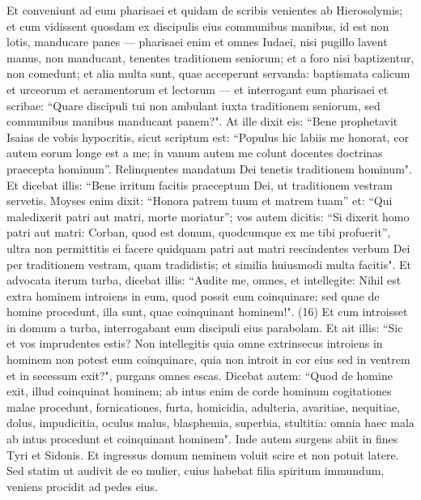 \begin{biblechapter}  
\verse Et conveniunt ad eum pharisaei et quidam de scribis venientes ab Hierosolymis; 
\verse et cum vidissent quosdam ex discipulis eius communibus manibus, id est non lotis, manducare panes 
\verse — pharisaei enim et omnes Iudaei, nisi pugillo lavent manus, non manducant, tenentes traditionem seniorum;  
\verse et a foro nisi baptizentur, non comedunt; et alia multa sunt, quae acceperunt servanda: baptismata calicum et urceorum et aeramentorum et lectorum — 
\verse et interrogant eum pharisaei et scribae: “Quare discipuli tui non ambulant iuxta traditionem seniorum, sed communibus manibus manducant panem?". 
\verse At ille dixit eis: “Bene prophetavit Isaias de vobis hypocritis, sicut scriptum est: “Populus hic labiis me honorat, cor autem eorum longe est a me; 
\verse in vanum autem me colunt docentes doctrinas praecepta hominum”. 
\verse Relinquentes mandatum Dei tenetis traditionem hominum". 
\verse Et dicebat illis: “Bene irritum facitis praeceptum Dei, ut traditionem vestram servetis.  
\verse Moyses enim dixit: “Honora patrem tuum et matrem tuam” et: “Qui maledixerit patri aut matri, morte moriatur”; 
\verse vos autem dicitis: “Si dixerit homo patri aut matri: Corban, quod est donum, quodcumque ex me tibi profuerit”,  
\verse ultra non permittitis ei facere quidquam patri aut matri 
\verse rescindentes verbum Dei per traditionem vestram, quam tradidistis; et similia huiusmodi multa facitis". 
\verse Et advocata iterum turba, dicebat illis: “Audite me, omnes, et intellegite:  
\verse Nihil est extra hominem introiens in eum, quod possit eum coinquinare; sed quae de homine procedunt, illa sunt, quae coinquinant hominem!". (16) 
\verse Et cum introisset in domum a turba, interrogabant eum discipuli eius parabolam. 
\verse Et ait illis: “Sic et vos imprudentes estis? Non intellegitis quia omne extrinsecus introiens in hominem non potest eum coinquinare, 
\verse quia non introit in cor eius sed in ventrem et in secessum exit?", purgans omnes escas. 
\verse Dicebat autem: “Quod de homine exit, illud coinquinat hominem; 
\verse ab intus enim de corde hominum cogitationes malae procedunt, fornicationes, furta, homicidia, 
\verse adulteria, avaritiae, nequitiae, dolus, impudicitia, oculus malus, blasphemia, superbia, stultitia:  
\verse omnia haec mala ab intus procedunt et coinquinant hominem". 
\verse Inde autem surgens abiit in fines Tyri et Sidonis. Et ingressus domum neminem voluit scire et non potuit latere. 
\verse Sed statim ut audivit de eo mulier, cuius habebat filia spiritum immundum, veniens procidit ad pedes eius. 

\end{biblechapter}
